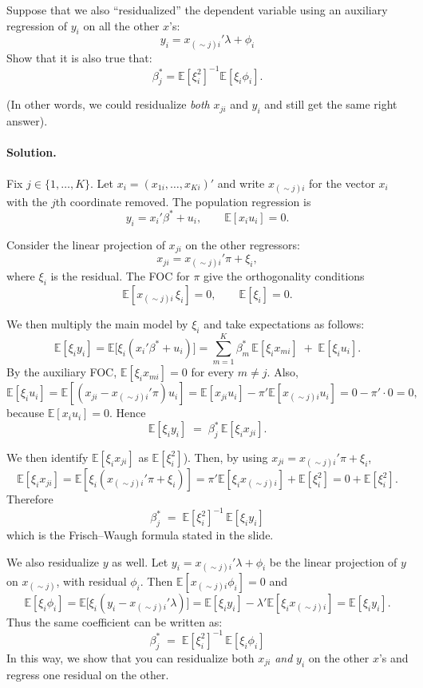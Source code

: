 \documentclass[12pt]{article}
\newcommand{\E}{\mathbb{E}}
\numberwithin{equation}{section}
\newcommand{\solution}{\paragraph{Solution.}}
\begin{document}
Suppose that we also ``residualized'' the dependent variable using an auxiliary regression 
of $y_i$ on all the other $x$'s:
\[
y_i = x_{(\sim j)i}' \lambda + \phi_i
\]
Show that it is also true that:
\[
\beta_j^\ast = \E[\xi_i^2]^{-1}\E[\xi_i \phi_i].
\]

(In other words, we could residualize \emph{both} $x_{ji}$ and $y_i$ and still get the 
same right answer).

\solution
    Fix $j\in\{1,\dots,K\}$. Let $x_i=(x_{1i},\ldots,x_{Ki})'$ and write $x_{(\sim j)i}$ for the vector $x_i$ with the $j$th coordinate removed. The population regression is
    \[
    y_i = x_i'\beta^* + u_i, \qquad \E[x_i u_i]=0.
    \]
    
    Consider the linear projection of $x_{ji}$ on the other regressors:
    \[
    x_{ji} = x_{(\sim j)i}'\pi + \xi_i,
    \]
    where $\xi_i$ is the residual. The FOC for $\pi$ give the orthogonality conditions
    \[
    \E[x_{(\sim j)i}\,\xi_i]=0, \qquad \E[\xi_i]=0.
    \]
    
    We then multiply the main model by $\xi_i$ and take expectations as follows:
    \[
    \E[\xi_i y_i]
    = \E\!\big[\xi_i(x_i'\beta^*+u_i)\big]
    = \sum_{m=1}^K \beta_m^*\,\E[\xi_i x_{mi}] \;+\; \E[\xi_i u_i].
    \]
    By the auxiliary FOC, $\E[\xi_i x_{mi}]=0$ for every $m\neq j$. Also,
    \[
    \E[\xi_i u_i]=\E[(x_{ji}-x_{(\sim j)i}'\pi)u_i]
    = \E[x_{ji}u_i]-\pi'\E[x_{(\sim j)i}u_i]=0- \pi'\cdot 0=0,
    \]
    because $\E[x_i u_i]=0$. Hence
    \[
    \E[\xi_i y_i] \;=\; \beta_j^*\,\E[\xi_i x_{ji}].
    \]
    
    We then identify $\E[\xi_i x_{ji}]$ as $\E[\xi_i^2]$). Then, by using $x_{ji}=x_{(\sim j)i}'\pi+\xi_i$,
    \[
    \E[\xi_i x_{ji}]
    = \E[\xi_i(x_{(\sim j)i}'\pi+\xi_i)]
    = \pi'\E[\xi_i x_{(\sim j)i}] + \E[\xi_i^2]
    = 0 + \E[\xi_i^2].
    \]
    Therefore
    \[
    \;\beta_j^* \;=\; \E[\xi_i^2]^{-1}\,\E[\xi_i y_i]\;
    \]
    which is the Frisch–Waugh formula stated in the slide.

    \medskip

    We also residualize $y$ as well.
    Let $y_i = x_{(\sim j)i}'\lambda + \phi_i$ be the linear projection of $y$ on $x_{(\sim j)}$, with residual $\phi_i$. Then $\E[x_{(\sim j)i}\phi_i]=0$ and
    \[
    \E[\xi_i\phi_i]
    = \E\!\big[\xi_i(y_i - x_{(\sim j)i}'\lambda)\big]
    = \E[\xi_i y_i] - \lambda'\E[\xi_i x_{(\sim j)i}]
    = \E[\xi_i y_i].
    \]
    Thus the same coefficient can be written as:
    \[
    \;\beta_j^* \;=\; \E[\xi_i^2]^{-1}\,\E[\xi_i \phi_i]\;
    \]
    In this way, we show that you can residualize both $x_{ji}$ \emph{and} $y_i$ on the other $x$’s and regress one residual on the other.
\end{document}
